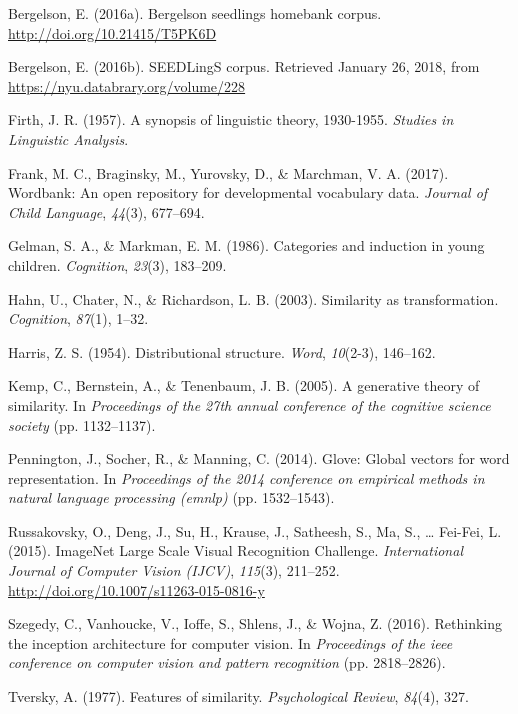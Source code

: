 \documentclass[10pt, letterpaper]{article}
\begin{document}
\hypertarget{refs}{}
\hypertarget{ref-bergelson2016seedlings}{}
Bergelson, E. (2016a). Bergelson seedlings homebank corpus.
\url{http://doi.org/10.21415/T5PK6D}

\hypertarget{ref-bergelson2016seedlingsdatabrary}{}
Bergelson, E. (2016b). SEEDLingS corpus. Retrieved January 26, 2018,
from \url{https://nyu.databrary.org/volume/228}

\hypertarget{ref-firth1957synopsis}{}
Firth, J. R. (1957). A synopsis of linguistic theory, 1930-1955.
\emph{Studies in Linguistic Analysis}.

\hypertarget{ref-frank2017wordbank}{}
Frank, M. C., Braginsky, M., Yurovsky, D., \& Marchman, V. A. (2017).
Wordbank: An open repository for developmental vocabulary data.
\emph{Journal of Child Language}, \emph{44}(3), 677--694.

\hypertarget{ref-gelman1986categories}{}
Gelman, S. A., \& Markman, E. M. (1986). Categories and induction in
young children. \emph{Cognition}, \emph{23}(3), 183--209.

\hypertarget{ref-hahn2003similarity}{}
Hahn, U., Chater, N., \& Richardson, L. B. (2003). Similarity as
transformation. \emph{Cognition}, \emph{87}(1), 1--32.

\hypertarget{ref-harris1954distributional}{}
Harris, Z. S. (1954). Distributional structure. \emph{Word},
\emph{10}(2-3), 146--162.

\hypertarget{ref-kemp2005generative}{}
Kemp, C., Bernstein, A., \& Tenenbaum, J. B. (2005). A generative theory
of similarity. In \emph{Proceedings of the 27th annual conference of the
cognitive science society} (pp. 1132--1137).

\hypertarget{ref-pennington2014glove}{}
Pennington, J., Socher, R., \& Manning, C. (2014). Glove: Global vectors
for word representation. In \emph{Proceedings of the 2014 conference on
empirical methods in natural language processing (emnlp)} (pp.
1532--1543).

\hypertarget{ref-ILSVRC15}{}
Russakovsky, O., Deng, J., Su, H., Krause, J., Satheesh, S., Ma, S.,
\ldots{} Fei-Fei, L. (2015). ImageNet Large Scale Visual Recognition
Challenge. \emph{International Journal of Computer Vision (IJCV)},
\emph{115}(3), 211--252. \url{http://doi.org/10.1007/s11263-015-0816-y}

\hypertarget{ref-szegedy2016rethinking}{}
Szegedy, C., Vanhoucke, V., Ioffe, S., Shlens, J., \& Wojna, Z. (2016).
Rethinking the inception architecture for computer vision. In
\emph{Proceedings of the ieee conference on computer vision and pattern
recognition} (pp. 2818--2826).

\hypertarget{ref-tversky1977features}{}
Tversky, A. (1977). Features of similarity. \emph{Psychological Review},
\emph{84}(4), 327.
\end{document}
